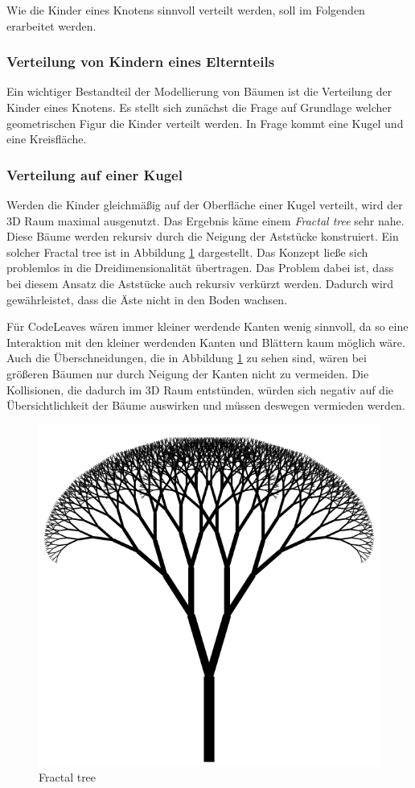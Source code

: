 Wie die Kinder eines Knotens sinnvoll verteilt werden, soll im Folgenden erarbeitet werden.

\subsubsection*{Verteilung von Kindern eines Elternteils}

Ein wichtiger Bestandteil der Modellierung von Bäumen ist die Verteilung der Kinder eines Knotens. Es stellt sich zunächst die Frage auf Grundlage welcher geometrischen Figur die Kinder verteilt werden. In Frage kommt eine Kugel und eine Kreisfläche.

\subsubsection*{Verteilung auf einer Kugel}
Werden die Kinder gleichmäßig auf der Oberfläche einer Kugel verteilt, wird der 3D Raum maximal ausgenutzt. Das Ergebnis käme einem \textit{Fractal tree} sehr nahe. Diese Bäume werden rekursiv durch die Neigung der Aststücke konstruiert. Ein solcher Fractal tree ist in Abbildung \ref{fig:fractal-tree} dargestellt. Das Konzept ließe sich problemlos in die Dreidimensionalität übertragen. Das Problem dabei ist, dass bei diesem Ansatz die Aststücke auch rekursiv verkürzt werden. Dadurch wird gewährleistet, dass die Äste nicht in den Boden wachsen.

Für CodeLeaves wären immer kleiner werdende Kanten wenig sinnvoll, da so eine Interaktion mit den kleiner werdenden Kanten und Blättern kaum möglich wäre. Auch die Überschneidungen, die in Abbildung \ref{fig:fractal-tree} zu sehen sind, wären bei größeren Bäumen nur durch Neigung der Kanten nicht zu vermeiden. Die Kollisionen, die dadurch im 3D Raum entstünden, würden sich negativ auf die Übersichtlichkeit der Bäume auswirken und müssen deswegen vermieden werden.

\begin{figure}[htb]
  \includegraphics[width=.5\textwidth]{figures/fractal-tree}
  \caption{Fractal tree \cite{rocchini2017fractal}}
  \label{fig:fractal-tree}
\end{figure}

